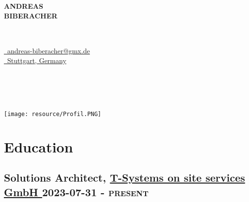 \documentclass{article}
\newcommand{\rside}[1]{\hfill \normalfont\scshape\MakeLowercase{#1}}
\begin{document}
\begin{center}
  \begin{minipage}{0.35\textwidth} 
    {\Huge\bfseries ANDREAS \\ BIBERACHER} \\
    {\sffamily{}} \\
  \end{minipage}\hfill
  \begin{minipage}{0.35\textwidth}
      \\
    \href{mailto:andreas-biberacher@gmx.de}{\faEnvelope\ \quad andreas-biberacher@gmx.de} \\
    \href{https://www.openstreetmap.org/search?query=Stuttgart}{\faMapMarker\ \quad  Stuttgart, Germany} \\
     \\
    \\
    \href{https://bibatwork.github.io/cv/}{\faGlobe } \quad \textbar \quad 
    \href{https://github.com/bibAtWork}{\faGithub }  \quad \textbar \quad  
    \href{https://www.linkedin.com/in/andreas-biberacher/}{\faLinkedin} \\
    \\
  \end{minipage}
  \begin{minipage}{0.2\textwidth}
    \texttt{[image: resource/Profil.PNG]}
  \end{minipage}
\end{center}

\section{\faGraduationCap\enspace Education}

\subsection{ Solutions Architect, \href{ https://www.linkedin.com/company/t-systems-on-site-services-gmbh/ }{ T-Systems on site services GmbH } \rside{ 2023-07-31 - PRESENT } }
\end{document}

